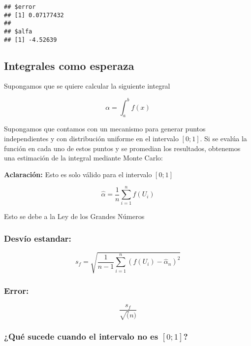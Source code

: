 \documentclass[
]{article}
\begin{document}
\begin{verbatim}
## $error
## [1] 0.07177432
## 
## $alfa
## [1] -4.52639
\end{verbatim}

\hypertarget{integrales-como-esperaza}{%
\subsection{Integrales como esperaza}\label{integrales-como-esperaza}}

Supongamos que se quiere calcular la siguiente integral

\begin{equation*}
  \alpha = \int_{a}^{b} f(x)
\end{equation*}

Supongamos que contamos con un mecanismo para generar puntos
independientes y con distribución uniforme en el intervalo \([0;1]\). Si
se evalúa la función en cada uno de estos puntos y se promedian los
resultados, obtenemos una estimación de la integral mediante Monte
Carlo:

\textbf{Aclaración:} Esto es solo válido para el intervalo \([0;1]\)

\begin{equation*}
  \hat{\alpha} = \dfrac{1}{n} \sum_{i = 1}^{n} f(U_i)
\end{equation*}

Esto se debe a la Ley de los Grandes Números

\hypertarget{desvuxedo-estandar}{%
\subsubsection{Desvío estandar:}\label{desvuxedo-estandar}}

\begin{equation*}
  s_f = \sqrt{\dfrac{1}{n-1} \sum_{i = 1}^{n} (f(U_i) -\hat{\alpha}_n)^2}
\end{equation*}

\hypertarget{error}{%
\subsubsection{Error:}\label{error}}

\begin{equation*}
  \dfrac{s_f}{\sqrt(n)}
\end{equation*}

\hypertarget{quuxe9-sucede-cuando-el-intervalo-no-es-01}{%
\subsubsection{\texorpdfstring{¿Qué sucede cuando el intervalo no es
\([0;1]\)?}{¿Qué sucede cuando el intervalo no es {[}0;1{]}?}}\label{quuxe9-sucede-cuando-el-intervalo-no-es-01}}
\end{document}
